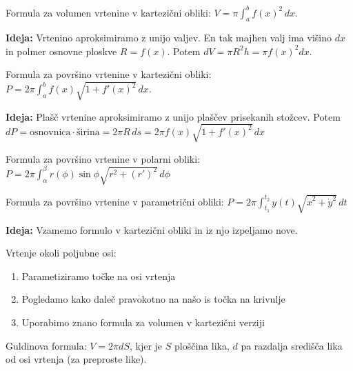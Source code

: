 Formula za volumen vrtenine  v kartezični obliki: $\displaystyle V = \pi \int_{a}^{b} f(x)^2  \,dx $.

\textbf{Ideja:}  Vrtenino aproksimiramo z unijo valjev. En tak majhen valj ima višino $dx$ in polmer osnovne ploskve $R = f(x)$. \newline Potem $dV = \pi R^2h = \pi f(x)^2dx$.

Formula za površino vrtenine v kartezični obliki: $\displaystyle P = 2 \pi \int_{a}^{b} f(x) \sqrt{1 + f'(x)^2}  \,dx $.

\textbf{Ideja:} Plašč vrtenine aproksimiramo z unijo plaščev prisekanih stožcev. \newline Potem $dP = \text{osnovnica} \cdot \text{širina} = 2 \pi R \, ds = 2 \pi f(x) \sqrt{1 + f'(x)^2}  \,dx $

Formula za površino vrtenine v polarni obliki: $\displaystyle P = 2 \pi \int_{\alpha}^{\beta} r(\phi) \sin \phi \sqrt{r^2 + (r')^2}  \,d \phi $

Formula za površino vrtenine v parametrični obliki: $\displaystyle P =  2 \pi \int_{t_1}^{t_2} y(t) \sqrt{\dot{x}^2 + \dot{y}^2}   \,dt $

\textbf{Ideja:}  Vzamemo formulo v kartezični obliki in iz njo izpeljamo nove.

Vrtenje okoli poljubne osi: 
\begin{enumerate}
    \item Parametiziramo točke na osi vrtenja
    \item Pogledamo kako daleč pravokotno na našo is točka na krivulje
    \item Uporabimo znano formula za volumen v kartezični verziji
\end{enumerate}
Guldinova formula: $V = 2 \pi d S$, kjer je $S$ ploščina lika, $d$ pa razdalja središča lika od osi vrtenja (za preproste like).


